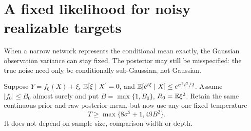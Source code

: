 \section{A fixed likelihood for noisy realizable targets}
\label{sec:compiler-fixed-temperature}
When a narrow network represents the conditional mean exactly, the
Gaussian observation variance can stay fixed.  The posterior may still
be misspecified: the true noise need only be conditionally sub-Gaussian,
not Gaussian.

Suppose $Y=f_0(X)+\xi$, $\mathbb E[\xi\mid X]=0$, and
$\mathbb E[e^{t\xi}\mid X]\le e^{\sigma^2t^2/2}$.  Assume $|f_0|\le B_0$
almost surely and put $B=\max\{1,B_0\}$, $R_0=\mathbb E\xi^2$.
Retain the same continuous prior and raw posterior mean, but now use any
one fixed temperature
\begin{equation}\label{eq:compiler-fixed-T}
 T\ge\max\{8\sigma^2+1,49B^2\}.
\end{equation}
It does not depend on sample size, comparison width or depth.

